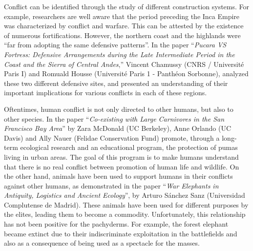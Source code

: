 
Conflict can be identified through the study of different construction systems. For example, researchers are well aware that the period preceding the Inca Empire was characterized by conflict and warfare. This can be attested by the existence of numerous fortifications. However, the northern coast and the highlands were “far from adopting the same defensive patterns”. In the paper “\emph{Pucara VS Fortress: Defensive Arrangements during the Late Intermediate Period in the Coast and the Sierra of Central Andes},” Vincent Chamussy (CNRS / Université Paris I) and Romuald Housse (Université Paris 1 - Panthéon Sorbonne), analyzed these two different defensive sites, and presented an understanding of their important implications for various conflicts in each of these regions. 


Oftentimes,  human conflict is not only directed to other humans, but also to other species. In the paper “\emph{Co-existing with Large Carnivores in the San Francisco Bay Area}” by Zara McDonald (UC Berkeley), Anne Orlando (UC Davis) and Ally Nauer (Felidae Conservation Fund) promote, through a long-term ecological research and an educational program, the protection of pumas living in urban areas. The goal of this program is to make humans understand that there is no real conflict between promotion of human life and wildlife. On the other hand, animals have been used to support humans in their conflicts against other humans, as demonstrated in the paper “\emph{War Elephants in Antiquity, Logistics and Ancient Ecology}”, by Arturo Sánchez Sanz (Universidad Complutense de Madrid). These animals have been used for different purposes by the elites, leading them to become a commodity. Unfortunately, this relationship has not been positive for the pachyderms. For example, the forest elephant became extinct due to their indiscriminate exploitation in the battlefields and also as a consequence of being used as a spectacle for the masses. 

